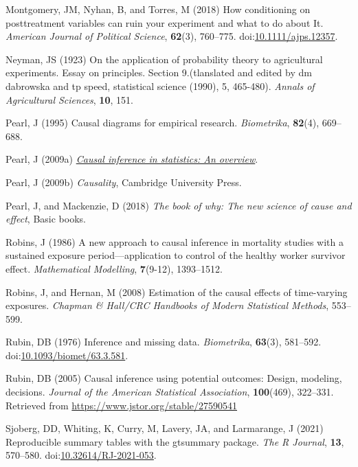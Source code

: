 \documentclass[
  singlecolumn]{article}
\newlength{\cslhangindent}
\newenvironment{CSLReferences}[2] %
 {\begin{list}{}{%
  \setlength{\itemindent}{0pt}
  \setlength{\leftmargin}{0pt}
  \setlength{\parsep}{0pt}
  \ifodd #1
   \setlength{\leftmargin}{\cslhangindent}
   \setlength{\itemindent}{-1\cslhangindent}
  \fi
  \setlength{\itemsep}{#2\baselineskip}}}
 {\end{list}}
\begin{document}
\begin{CSLReferences}{1}{0}
Montgomery, JM, Nyhan, B, and Torres, M (2018) How conditioning on
posttreatment variables can ruin your experiment and what to do about
It. \emph{American Journal of Political Science}, \textbf{62}(3),
760--775.
doi:\href{https://doi.org/10.1111/ajps.12357}{10.1111/ajps.12357}.

Neyman, JS (1923) On the application of probability theory to
agricultural experiments. Essay on principles. Section 9.(tlanslated and
edited by dm dabrowska and tp speed, statistical science (1990), 5,
465-480). \emph{Annals of Agricultural Sciences}, \textbf{10}, 151.

Pearl, J (1995) Causal diagrams for empirical research.
\emph{Biometrika}, \textbf{82}(4), 669--688.

Pearl, J (2009a) \emph{\href{https://doi.org/10.1214/09-SS057}{Causal
inference in statistics: An overview}}.

Pearl, J (2009b) \emph{Causality}, Cambridge University Press.

Pearl, J, and Mackenzie, D (2018) \emph{The book of why: The new science
of cause and effect}, Basic books.

Robins, J (1986) A new approach to causal inference in mortality studies
with a sustained exposure period---application to control of the healthy
worker survivor effect. \emph{Mathematical Modelling}, \textbf{7}(9-12),
1393--1512.

Robins, J, and Hernan, M (2008) Estimation of the causal effects of
time-varying exposures. \emph{Chapman \& Hall/CRC Handbooks of Modern
Statistical Methods}, 553--599.

Rubin, DB (1976) Inference and missing data. \emph{Biometrika},
\textbf{63}(3), 581--592.
doi:\href{https://doi.org/10.1093/biomet/63.3.581}{10.1093/biomet/63.3.581}.

Rubin, DB (2005) Causal inference using potential outcomes: Design,
modeling, decisions. \emph{Journal of the American Statistical
Association}, \textbf{100}(469), 322--331. Retrieved from
\url{https://www.jstor.org/stable/27590541}

Sjoberg, DD, Whiting, K, Curry, M, Lavery, JA, and Larmarange, J (2021)
Reproducible summary tables with the gtsummary package. \emph{{The R
Journal}}, \textbf{13}, 570--580.
doi:\href{https://doi.org/10.32614/RJ-2021-053}{10.32614/RJ-2021-053}.


\end{CSLReferences}
\end{document}
